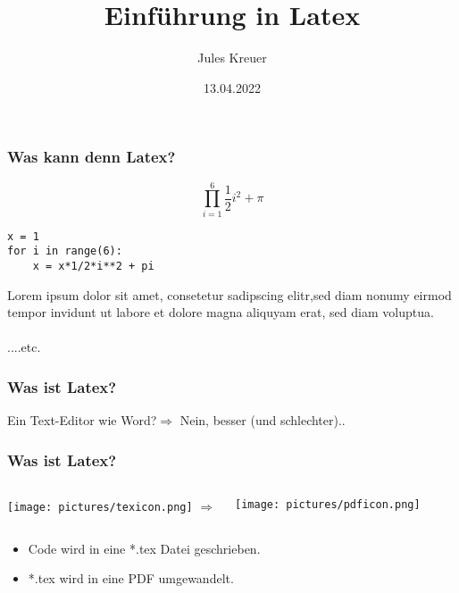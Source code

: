 \documentclass{beamer}
\title[]{Einführung in Latex} %
\author{Jules Kreuer} %
\institute[FSI] %
{
FSI Uni Tübingen\\
angelehnt auf den Workshop von Adreas Rist 2019\\
\medskip
\textit{fsi@fsi.uni-tuebingen.de}\\
}
\date{13.04.2022} %
\begin{document}
\begin{frame}
\titlepage %
\end{frame}





\begin{frame}[fragile]
\frametitle{Was kann denn Latex?}
\[
\prod^6_{i=1} \frac{1}{2}i^2 + \pi
\]
\begin{verbatim}
x = 1
for i in range(6):
	x = x*1/2*i**2 + pi
\end{verbatim}
Lorem ipsum dolor sit amet, consetetur sadipscing elitr,sed diam nonumy eirmod tempor invidunt ut labore et dolore magna aliquyam erat, sed diam voluptua.\\\\
....etc.
\end{frame}

\begin{frame}
\frametitle{Was ist Latex?}
    Ein Text-Editor wie Word?\pause $\Rightarrow$ Nein, besser (und schlechter)..
     
\end{frame}


\begin{frame}
     \frametitle{Was ist Latex?}
     \begin{columns}[c] %
          
     \texttt{[image: pictures/texicon.png]}
     \Huge{$ \Rightarrow $}
          
     \texttt{[image: pictures/pdficon.png]}
          
     \end{columns}
\begin{itemize}[<+->]
     \item Code wird in eine *.tex Datei geschrieben.
     \item *.tex wird in eine PDF umgewandelt.
\end{itemize}
\end{frame}
\end{document}
